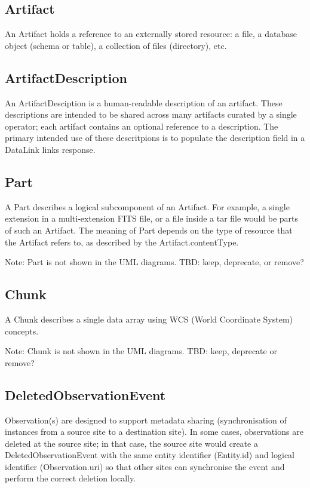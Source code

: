 \documentclass[11pt,a4paper]{ivoa}
\begin{document}
\subsection{Artifact}

An Artifact holds a reference to an externally stored resource: a file, a
database object (schema or table), a collection of files (directory), etc.

\subsection{ArtifactDescription}

An ArtifactDesciption is a human-readable description of an artifact. These
descriptions are intended to be shared across many artifacts curated by a single
operator; each artifact contains an optional reference to a description. The
primary intended use of these descritpions is to populate the description field
in a DataLink links response.

\subsection{Part}

A Part describes a logical subcomponent of an Artifact. For example, a single 
extension in a multi-extension FITS file, or a file inside a tar file would be parts
of such an Artifact. The meaning of Part depends on the type of resource that the
Artifact refers to, as described by the Artifact.contentType.

Note: Part is not shown in the UML diagrams. TBD: keep, deprecate, or remove?

\subsection{Chunk}

A Chunk describes a single data array using WCS (World Coordinate System) concepts. 

Note: Chunk is not shown in the UML diagrams. TBD: keep, deprecate or remove?

\subsection{DeletedObservationEvent}

Observation(s) are designed to support metadata sharing (synchronisation of instances
from a source site to a destination site). In some cases, observations are deleted at the 
source site; in that case, the source site would create a DeletedObservationEvent with the same 
entity identifier (Entity.id) and logical identifier (Observation.uri) so that other sites can
synchronise the event and perform the correct deletion locally.
\end{document}
